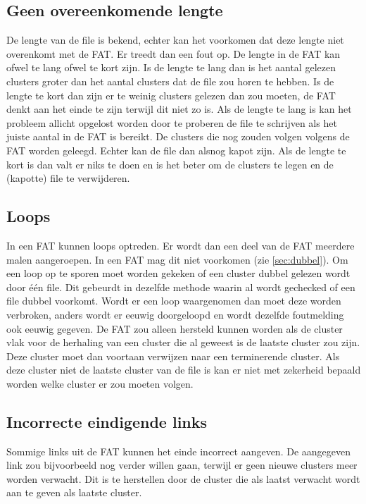 \documentclass[11pt]{article}
\begin{document}
	\subsection{Geen overeenkomende lengte}\label{sec:lengte}
	De lengte van de file is bekend, echter kan het voorkomen dat deze lengte niet overenkomt met de FAT. Er treedt dan een fout op. De lengte in de FAT kan ofwel te lang ofwel te kort zijn. Is de lengte te lang dan is het aantal gelezen clusters groter dan het aantal clusters dat de file zou horen te hebben. Is de lengte te kort dan zijn er te weinig clusters gelezen dan zou moeten, de FAT denkt aan het einde te zijn terwijl dit niet zo is. Als de lengte te lang is kan het probleem allicht opgelost worden door te proberen de file te schrijven als het juiste aantal in de FAT is bereikt. De clusters die nog zouden volgen volgens de FAT worden geleegd. Echter kan de file dan alsnog kapot zijn. Als de lengte te kort is dan valt er niks te doen en is het beter om de clusters te legen en de (kapotte) file te verwijderen.

	\subsection{Loops}\label{sec:loops}
	In een FAT kunnen loops optreden. Er wordt dan een deel van de FAT meerdere malen aangeroepen. In een FAT mag dit niet voorkomen (zie \ref{sec:dubbel}). Om een loop op te sporen moet worden gekeken of een cluster dubbel gelezen wordt door \'e\'en file. Dit gebeurdt in dezelfde methode waarin al wordt gechecked of een file dubbel voorkomt. Wordt er een loop waargenomen dan moet deze worden verbroken, anders wordt er eeuwig doorgeloopd en wordt dezelfde foutmelding ook eeuwig gegeven. De FAT zou alleen hersteld kunnen worden als de cluster vlak voor de herhaling van een cluster die al geweest is de laatste cluster zou zijn. Deze cluster moet dan voortaan verwijzen naar een terminerende cluster. Als deze cluster niet de laatste cluster van de file is kan er niet met zekerheid bepaald worden welke cluster er zou moeten volgen.

	\subsection{Incorrecte eindigende links}\label{sec:links}
	Sommige links uit de FAT kunnen het einde incorrect aangeven. De aangegeven link zou bijvoorbeeld nog verder willen gaan, terwijl er geen nieuwe clusters meer worden verwacht. Dit is te herstellen door de cluster die als laatst verwacht wordt aan te geven als laatste cluster.
\end{document}

